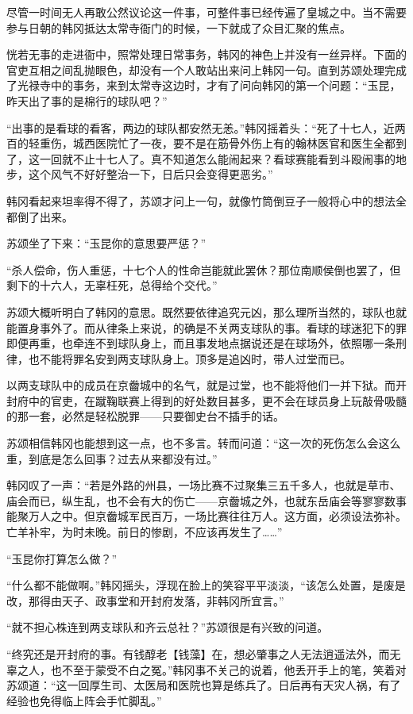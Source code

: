 尽管一时间无人再敢公然议论这一件事，可整件事已经传遍了皇城之中。当不需要参与日朝的韩冈抵达太常寺衙门的时候，一下就成了众目汇聚的焦点。

恍若无事的走进衙中，照常处理日常事务，韩冈的神色上并没有一丝异样。下面的官吏互相之间乱抛眼色，却没有一个人敢站出来问上韩冈一句。直到苏颂处理完成了光禄寺中的事务，来到太常寺这边时，才有了问向韩冈的第一个问题：“玉昆，昨天出了事的是棉行的球队吧？”

“出事的是看球的看客，两边的球队都安然无恙。”韩冈摇着头：“死了十七人，近两百的轻重伤，城西医院忙了一夜，要不是在筋骨外伤上有的翰林医官和医生全都到了，这一回就不止十七人了。真不知道怎么能闹起来？看球赛能看到斗殴闹事的地步，这个风气不好好整治一下，日后只会变得更恶劣。”

韩冈看起来坦率得不得了，苏颂才问上一句，就像竹筒倒豆子一般将心中的想法全都倒了出来。

苏颂坐了下来：“玉昆你的意思要严惩？”

“杀人偿命，伤人重惩，十七个人的性命岂能就此罢休？那位南顺侯倒也罢了，但剩下的十六人，无辜枉死，总得给个交代。”

苏颂大概听明白了韩冈的意思。既然要依律追究元凶，那么理所当然的，球队也就能置身事外了。而从律条上来说，的确是不关两支球队的事。看球的球迷犯下的罪即便再重，也牵连不到球队身上，而且事发地点据说还是在球场外，依照哪一条刑律，也不能将罪名安到两支球队身上。顶多是追凶时，带人过堂而已。

以两支球队中的成员在京齤城中的名气，就是过堂，也不能将他们一并下狱。而开封府中的官吏，在蹴鞠联赛上得到的好处数目甚多，更不会在球员身上玩敲骨吸髓的那一套，必然是轻松脱罪——只要御史台不插手的话。

苏颂相信韩冈也能想到这一点，也不多言。转而问道：“这一次的死伤怎么会这么重，到底是怎么回事？过去从来都没有过。”

韩冈叹了一声：“若是外路的州县，一场比赛不过聚集三五千多人，也就是草市、庙会而已，纵生乱，也不会有大的伤亡——京齤城之外，也就东岳庙会等寥寥数事能聚万人之中。但京齤城军民百万，一场比赛往往万人。这方面，必须设法弥补。亡羊补牢，为时未晚。前日的惨剧，不应该再发生了……”

“玉昆你打算怎么做？”

“什么都不能做啊。”韩冈摇头，浮现在脸上的笑容平平淡淡，“该怎么处置，是废是改，那得由天子、政事堂和开封府发落，非韩冈所宜言。”

“就不担心株连到两支球队和齐云总社？”苏颂很是有兴致的问道。

“终究还是开封府的事。有钱醇老【钱藻】在，想必肇事之人无法逍遥法外，而无辜之人，也不至于蒙受不白之冤。”韩冈事不关己的说着，他丢开手上的笔，笑着对苏颂道：“这一回厚生司、太医局和医院也算是练兵了。日后再有天灾人祸，有了经验也免得临上阵会手忙脚乱。”

